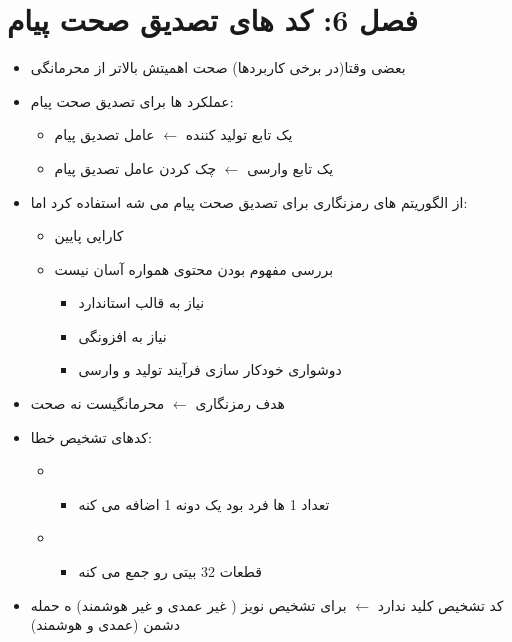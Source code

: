 \documentclass{report}
\begin{document}
	\section{فصل 6: کد های تصدیق صحت پیام}
	
	\begin{itemize}
		\item 
		بعضی وقتا(در برخی کاربردها) صحت اهمیتش بالاتر از محرمانگی
		\item 
عملکرد ها برای تصدیق صحت پیام:
			\begin{itemize}
				 \item 
				یک تابع تولید کننده 
				$\leftarrow$
				 عامل تصدیق پیام
				 \item
				 یک تابع وارسی
				 $\leftarrow$
				 چک کردن عامل تصدیق پیام
				
			\end{itemize}
		\item 
			از الگوریتم های رمزنگاری برای تصدیق صحت پیام می شه استفاده کرد اما:
				\begin{itemize}
					\item 
					کارایی پایین
					\item
					 بررسی مفهوم بودن محتوی همواره آسان نیست
					 	\begin{itemize}
					 		\item 
					 		نیاز به قالب استاندارد
					 		\item 
					 		نیاز به افزونگی
					 		\item 
					 		دوشواری خودکار سازی فرآیند تولید و وارسی
					 	\end{itemize}
				\end{itemize}
		\item 
			هدف رمزنگاری
			$\leftarrow$
			محرمانگیست نه صحت
		\item 
			کدهای تشخیص خطا:
			\begin{itemize}
				\item {}	
					\begin{itemize}
						\item 
						تعداد 1 ها فرد بود یک دونه 1 اضافه می کنه
					\end{itemize}
				\item {}
					\begin{itemize}
						\item 
						قطعات 32 بیتی رو جمع می کنه
					\end{itemize}
			\end{itemize}
		\item 
		کد تشخیص کلید ندارد
		$\leftarrow$
		برای تشخیص نویز ( غیر عمدی و غیر هوشمند) ه حمله دشمن (عمدی و هوشمند)
		

\end{itemize}
\end{document}

